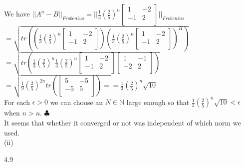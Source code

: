 \documentclass[12pt]{article}
\newenvironment{problems}{\begin{list}{}{\setlength{\labelwidth}{.7in}}}{\end{list}}
\begin{document}
\begin{problems}
 We have  $||A^n-B||_{Frobenius} = || 
  \frac{1}{3}(\frac{2}{5})^n
  \begin{bmatrix}
   1 &  -2 \\
   -1 &  2\\
  \end{bmatrix}    ||_{Frobenius} $\\
  $= \sqrt{ tr\left(\left(\frac{1}{3}(\frac{2}{5})^n
  \begin{bmatrix}
   1 &  -2 \\
   -1 &  2\\
  \end{bmatrix}\right)\left( \frac{1}{3}(\frac{2}{5})^n
  \begin{bmatrix}
   1 &  -2 \\
   -1 &  2\\
  \end{bmatrix}  \right)^H  \right)}$\\
  $ = \sqrt{ tr\left(\frac{1}{3}(\frac{2}{5})^n\frac{1}{3}(\frac{2}{5})^n\begin{bmatrix}
   1 &  -2 \\
   -1 &  2\\
  \end{bmatrix}\begin{bmatrix}
   1 &  -1 \\
   -2 &  2\\
  \end{bmatrix}      \right) }$\\
  
  $ = \sqrt{\frac{1}{9}\left( \frac{2}{5}  \right)^{2n}tr\left(\begin{bmatrix}
   5 &  -5 \\
   -5 &  5\\
  \end{bmatrix}\right) =                                    } = \frac{1}{3}\left(\frac{2}{5}\right)^n\sqrt{10}$\\
  
  For each $\epsilon >0$ we can choose an $N\in \mathbb{N}$ large enough so that $\frac{1}{3}\left(\frac{2}{5}\right)^n\sqrt{10} < \epsilon$ when $n>n$. \hfill $\clubsuit$\\
  
 It seems that whether it converged or not was independent of which norm we used.\\
 
 (ii)
 
 \item[4.9]
 

\end{problems}
\end{document}

